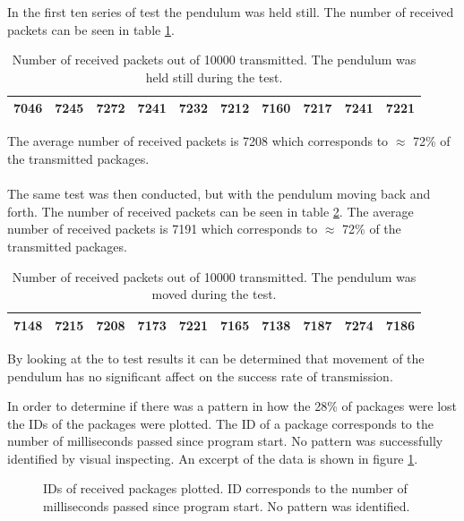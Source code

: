 {In the first ten series of test the pendulum was held still.
The number of received packets can be seen in table \ref{tab:received_still}.
\begin{table}[]
\centering
\begin{tabular}{|l|l|l|l|l|l|l|l|l|l|}
\hline
7046 & 7245 & 7272 & 7241 & 7232 & 7212 & 7160 & 7217 & 7241 & 7221 \\ \hline
\end{tabular}
\caption[Number of received packets without movement.]{Number of received packets out of 10000 transmitted. The pendulum was held still during the test.}
\label{tab:received_still}
\end{table}
The average number of received packets is 7208 which corresponds to $\approx$ 72\% of the transmitted packages.
\\~\\
The same test was then conducted, but with the pendulum moving back and forth.
The number of received packets can be seen in table \ref{tab:received_moved}.
The average number of received packets is 7191 which corresponds to $\approx$ 72\% of the transmitted packages.

\begin{table}[]
\centering
\begin{tabular}{|l|l|l|l|l|l|l|l|l|l|}
\hline
7148 & 7215 & 7208 & 7173 & 7221 & 7165 & 7138 & 7187 & 7274 & 7186 \\ \hline
\end{tabular}
\caption[Number of received packets with movement.]{Number of received packets out of 10000 transmitted. The pendulum was moved during the test.}
\label{tab:received_moved}
\end{table}
By looking at the to test results it can be determined that movement of the pendulum has no significant affect on the success rate of transmission.

In order to determine if there was a pattern in how the 28\% of packages were lost the IDs of the packages were plotted.
The ID of a package corresponds to the number of milliseconds passed since program start.
No pattern was successfully identified by visual inspecting.
An excerpt of the data is shown in figure \ref{fig:received_packets}.

\begin{figure}[h]
	\centering
    
	\caption[IDs of received packages plotted.]{IDs of received packages plotted. ID corresponds to the number of milliseconds passed since program start. No pattern was identified.}
	\label{fig:received_packets}
\end{figure}

}
